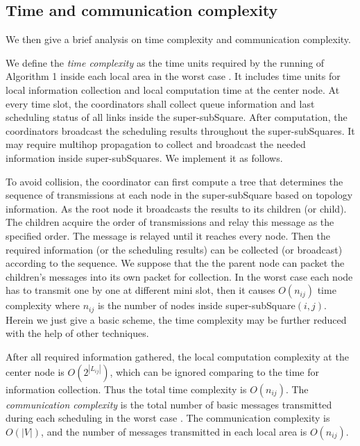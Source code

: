 \documentclass[journal]{IEEEtran}
\begin{document}
\subsection{Time and communication complexity}
We then give a brief analysis on time complexity and communication complexity.

 We define the \emph{time complexity} as the time units required by the running of Algorithm 1 inside each local area in the worst case \cite{peleg87}. It includes time units for local information collection and local computation time at the center node.
  At every time slot, the coordinators shall collect queue information and last scheduling status of all links inside the super-subSquare. After computation, the coordinators broadcast the scheduling results throughout the super-subSquares.
  It may require multihop propagation to collect and broadcast the needed information inside super-subSquares.  We implement it as follows.

   To avoid collision, the coordinator can first compute a tree that determines the sequence of transmissions at each node in the super-subSquare based on topology information. As the root node it broadcasts the results to its children (or child). The children acquire the order of transmissions and relay this message as the specified order. The message is relayed until it reaches every node.
      Then the required information (or the scheduling results) can be collected (or broadcast) according to the sequence. We suppose that the the parent node can packet the children's messages into its own packet for collection.
      In the worst case each node has to transmit one by one at different mini slot, then it causes $O(n_{ij})$ time complexity where $n_{ij}$ is the number of nodes inside super-subSquare$(i,j)$. Herein we just give a basic scheme, the time complexity may be further reduced with the help of other techniques.

   After all required information gathered, the local computation complexity at the center node is $O(2^{|L_{ij}|})$, which can be ignored comparing to the time for information collection. Thus the total time complexity is $O(n_{ij})$.
 The \emph{ communication complexity} is the total number of basic messages transmitted during each scheduling in the worst case \cite{peleg87}. The communication complexity is $O(|V|)$, and the number of messages transmitted in each local area is $O(n_{ij})$.
\end{document}
